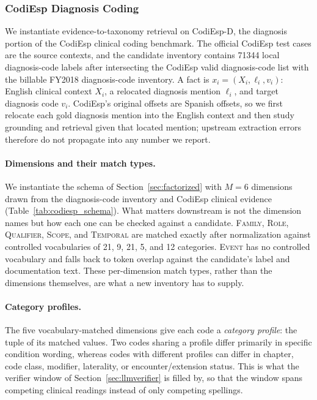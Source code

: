 
\subsubsection{CodiEsp Diagnosis Coding}
\label{sec:codiesp}

We instantiate evidence-to-taxonomy retrieval on CodiEsp-D, the diagnosis
portion of the CodiEsp clinical coding benchmark. The official CodiEsp test
cases are the source contexts, and the candidate inventory contains
\num{71344} local diagnosis-code labels after intersecting the CodiEsp valid
diagnosis-code list with the billable FY2018 diagnosis-code inventory. A fact
is $x_i=(X_i,\ell_i,v_i)$: English clinical context $X_i$, a relocated
diagnosis mention $\ell_i$, and target diagnosis code $v_i$. CodiEsp's original
offsets are Spanish offsets, so we first relocate each gold diagnosis mention
into the English context and then study grounding and retrieval given that
located mention; upstream extraction errors therefore do not propagate into any
number we report.

\paragraph{Dimensions and their match types.}
We instantiate the schema of Section~\ref{sec:factorized} with $M{=}6$
dimensions drawn from the diagnosis-code inventory and CodiEsp clinical
evidence (Table~\ref{tab:codiesp_schema}). What matters downstream is not the
dimension names but how each one can be checked against a candidate.
\textsc{Family}, \textsc{Role}, \textsc{Qualifier}, \textsc{Scope}, and
\textsc{Temporal} are matched exactly after normalization against controlled
vocabularies of 21, 9, 21, 5, and 12 categories. \textsc{Event} has no
controlled vocabulary and falls back to token overlap against the candidate's
label and documentation text. These per-dimension match types, rather than the
dimensions themselves, are what a new inventory has to supply.

\paragraph{Category profiles.}
The five vocabulary-matched dimensions give each code a \emph{category
profile}: the tuple of its matched values. Two codes sharing a profile differ
primarily in specific condition wording, whereas codes with different profiles
can differ in chapter, code class, modifier, laterality, or encounter/extension
status. This is what the verifier window of Section~\ref{sec:llmverifier} is
filled by, so that the window spans competing clinical readings instead of only
competing spellings.

